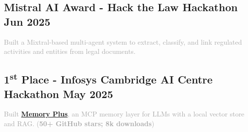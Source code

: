 \vspace{0.3em}

\subsection{{Mistral AI Award - Hack the Law Hackathon \hfill Jun 2025}}
\textcolor{darkgray}{
Built a Mixtral-based multi-agent system to extract, classify, and link regulated activities and entities from legal documents.
}
\vspace{0.3em}

\subsection{{1\textsuperscript{st} Place - Infosys Cambridge AI Centre Hackathon \hfill May 2025}}
\textcolor{darkgray}{
Built \href{https://github.com/Yuchen20/Memory-Plus}{\textbf{Memory Plus}}, an MCP memory layer for LLMs with a local vector store and RAG. (\textbf{50+ GitHub stars; 8k downloads})
}


